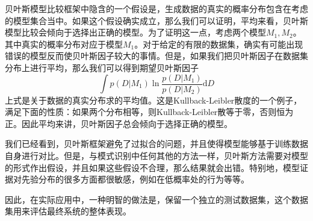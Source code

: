 贝叶斯模型比较框架中隐含的一个假设是，生成数据的真实的概率分布包含在考虑的模型集合当中。如果这个假设确实成立，那么我们可以证明，平均来看，贝叶斯模型比较会倾向于选择出正确的模型。为了证明这一点，考虑两个模型$M_1,M_2$。其中真实的概率分布对应于模型$M_1$。对于给定的有限的数据集，确实有可能出现错误的模型反而使贝叶斯因子较大的事情。但是，如果我们把贝叶斯因子在数据集分布上进行平均，那么我们可以得到期望贝叶斯因子 
\begin{equation}
	\int p(D|M_1)\ln \frac{p(D|M_1)}{p(D|M_2)}\mathrm{d}D
\end{equation}
上式是关于数据的真实分布求的平均值。这是Kullback-Leibler散度的一个例子，满足下面的性质：如果两个分布相等，则Kullback-Leibler散等于零，否则恒为正。因此平均来讲，贝叶斯因子总会倾向于选择正确的模型。

我们已经看到，贝叶斯框架避免了过拟合的问题，并且使得模型能够基于训练数据自身进行对比。但是，与模式识别中任何其他的方法一样，贝叶斯方法需要对模型的形式作出假设，并且如果这些假设不合理，那么结果就会出错。特别地，模型证据对先验分布的很多方面都很敏感，例如在低概率处的行为等等。

因此，在实际应用中，一种明智的做法是，保留一个独立的测试数据集，这个数据集用来评估最终系统的整体表现。